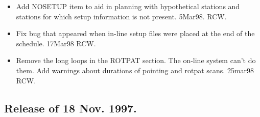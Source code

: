 \documentclass{report}
\begin{document}
\begin{itemize}
\item Add NOSETUP item to aid in planning with hypothetical stations
      and stations for which setup information is not present.
      5Mar98. RCW.

\item Fix bug that appeared when in-line setup files were placed
      at the end of the schedule.  17Mar98  RCW.

\item Remove the long loops in the ROTPAT section.  The on-line
      system can't do them.  Add warnings about durations of pointing
      and rotpat scans.  25mar98 RCW.

\end{itemize}

\subsection{\label{SSSEC:18NOV97}Release of 18 Nov. 1997.}
\end{document}
